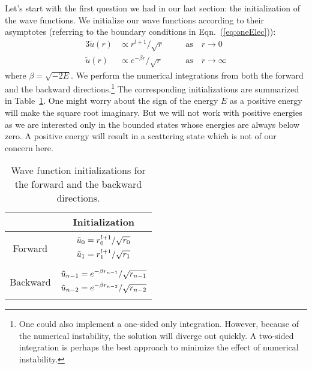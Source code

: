Let's start with the first question we had in our last section: the
initialization of the wave functions. We initialize our wave functions
according to their asymptotes (referring to the boundary conditions
in Eqn.~(\ref{eq:oneElec})):
\begin{alignat}{3} \label{eq:asym}
\tilde{u}(r) & \propto r^{l+1}/\sqrt{r}          && \quad\text{as}\quad r\rightarrow0 \\
\tilde{u}(r) & \propto e^{-\beta r}/\sqrt{r} && \quad\text{as}\quad r\rightarrow\infty
\end{alignat}
%
where $\beta = \sqrt{-2E}$. We perform the numerical integrations from both the forward and the backward
directions.\footnote{One could also implement a one-sided only integration.
However, because of the numerical instability, the solution will diverge out
quickly. A two-sided integration is perhaps the best approach to minimize
the effect of numerical instability.} The corresponding initializations
are summarized in Table~\ref{table:init}.
One might worry about the sign of the energy
$E$ as a positive energy will make the square root imaginary. But we will not
work with positive energies as we are interested only in the bounded states
whose energies are always below zero. A positive energy will result in a scattering
state which is not of our concern here.
%
\begin{table}[h!]
\caption{Wave function initializations for the forward and the backward
directions.}
\label{table:init}
\begin{center}
\begin{tabular}{|c|c|}
  \hline
  & Initialization \\ \hline
  Forward &
  $\begin{aligned}
  \smash[b]{\vphantom{\Big|}}
  \tilde{u}_0 & = r_0^{l+1} / \sqrt{r_0} \\
  \tilde{u}_1 & = r_1^{l+1} / \sqrt{r_1}
  \smash[t]{\vphantom{\Big|}}
  \end{aligned}$ \\ \hline
  Backward &
  $\begin{aligned}
  \smash[b]{\vphantom{\Big|}}
  \tilde{u}_{n-1} & = e^{-\beta r_{n-1}} / \sqrt{r_{n-1}} \\
  \tilde{u}_{n-2} & = e^{-\beta r_{n-2}} / \sqrt{r_{n-2}}
  \smash[t]{\vphantom{\Big|}}
  \end{aligned}$ \\
  \hline
\end{tabular}
\end{center}
\end{table}

